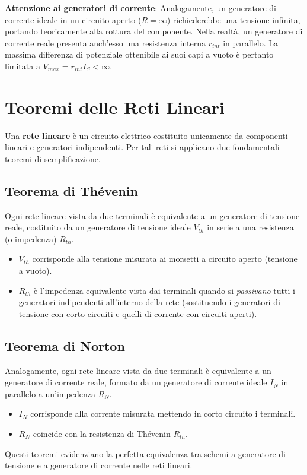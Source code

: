 \textbf{Attenzione ai generatori di corrente}: Analogamente, un generatore di corrente ideale in un circuito aperto ($R=\infty$) richiederebbe una tensione infinita, portando teoricamente alla rottura del componente. Nella realtà, un generatore di corrente reale presenta anch'esso una resistenza interna $r_{int}$ in parallelo. La massima differenza di potenziale ottenibile ai suoi capi a vuoto è pertanto limitata a $V_{max} = r_{int} I_S < \infty$.

\section{Teoremi delle Reti Lineari}
Una \textbf{rete lineare} è un circuito elettrico costituito unicamente da componenti lineari e generatori indipendenti. Per tali reti si applicano due fondamentali teoremi di semplificazione.

\subsection*{Teorema di Thévenin}
\label{sec:thevenin}
Ogni rete lineare vista da due terminali è equivalente a un generatore di tensione reale, costituito da un generatore di tensione ideale $V_{th}$ in serie a una resistenza (o impedenza) $R_{th}$.
\begin{itemize}[label=$\triangleright$]
    \item $V_{th}$ corrisponde alla tensione misurata ai morsetti a circuito aperto (tensione a vuoto).
    \item $R_{th}$ è l'impedenza equivalente vista dai terminali quando si \textit{passivano} tutti i generatori indipendenti all'interno della rete (sostituendo i generatori di tensione con corto circuiti e quelli di corrente con circuiti aperti).
\end{itemize}

\subsection*{Teorema di Norton}
\label{sec:norton}
Analogamente, ogni rete lineare vista da due terminali è equivalente a un generatore di corrente reale, formato da un generatore di corrente ideale $I_N$ in parallelo a un'impedenza $R_N$.
\begin{itemize}[label=$\triangleright$]
    \item $I_N$ corrisponde alla corrente misurata mettendo in corto circuito i terminali.
    \item $R_N$ coincide con la resistenza di Thévenin $R_{th}$.
\end{itemize}
Questi teoremi evidenziano la perfetta equivalenza tra schemi a generatore di tensione e a generatore di corrente nelle reti lineari.

